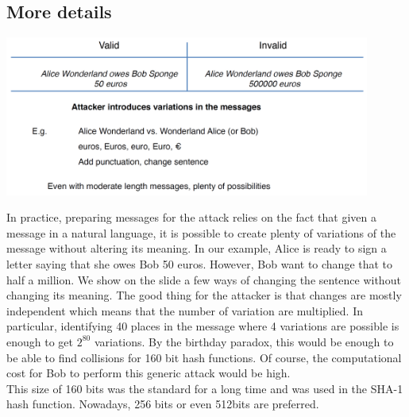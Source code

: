 	\subsection{More details}
		\begin{center}
			\includegraphics[width=120mm]{Graphics/Hash Functions/hf16.png}
		\end{center}
		In practice, preparing messages for the attack relies on the fact that given a message in a natural language, 
		it is possible to create plenty of variations of the message without altering its meaning. 
		In our example, Alice is ready to sign a letter saying that she owes Bob 50 euros. 
		However, Bob want to change that to half a million. 
		We show on the slide a few ways of changing the sentence without changing its meaning. 
		The good thing for the attacker is that changes are mostly independent which means that the number of variation are multiplied. 
		In particular, identifying 40 places in the message where 4 variations are possible is enough to get $2^{80}$ variations. 
		By the birthday paradox, this would be enough to be able to find collisions for 160 bit hash functions. 
		Of course, the computational cost for Bob to perform this generic attack would be high.\\
		This size of 160 bits was the standard for a long time and was used in the SHA-1 hash function. 
		Nowadays, 256 bits or even 512bits are preferred.
	
